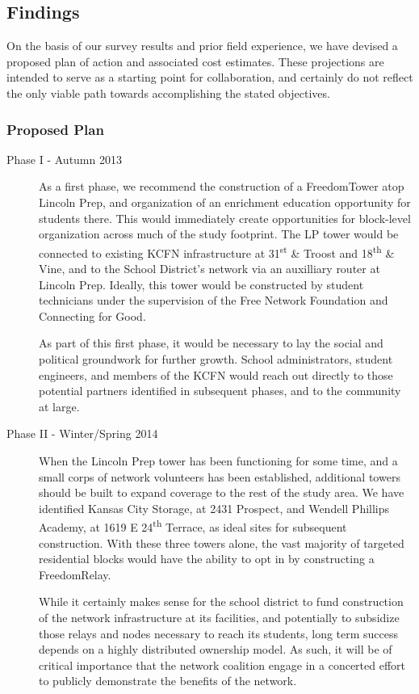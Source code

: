 \subsection{Findings}
On the basis of our survey results and prior field experience, we have devised
a proposed plan of action and associated cost estimates. These projections are intended
to serve as a starting point for collaboration, and certainly do not reflect the
only viable path towards accomplishing the stated objectives.\par

\subsubsection{Proposed Plan}
\begin{description}
\item[Phase I - Autumn 2013]
As a first phase, we recommend the construction of a FreedomTower atop Lincoln
Prep, and organization of an enrichment education opportunity for
students there. This would immediately create opportunities for block-level
organization across much of the study footprint. The LP tower would be
connected to existing KCFN infrastructure at 31\textsuperscript{st} \& Troost
and 18\textsuperscript{th}
\& Vine, and to the School District's network via an auxilliary router at
Lincoln Prep. Ideally, this tower would be constructed by student technicians
under the supervision of the Free Network Foundation and Connecting for Good. \par
As part of this first phase, it would be necessary to lay the social and
political groundwork for further growth. School administrators, student
engineers, and members of the KCFN would reach out directly to those potential
partners identified in subsequent phases, and to the community at large. \par

\item[Phase II - Winter/Spring 2014]
When the Lincoln Prep tower has been functioning for some time, and a small
corps of network volunteers has been established, additional towers should be
built to expand coverage to the rest of the study area. We have identified
Kansas City Storage, at 2431 Prospect, and Wendell Phillips Academy, at 1619 E
24\textsuperscript{th} Terrace, as ideal sites for subsequent construction. With these three
towers alone, the vast majority of targeted residential blocks would have the
ability to opt in by constructing a FreedomRelay. \par
While it certainly makes sense for the school district to fund  construction
of the network infrastructure at its facilities, and potentially to subsidize
those relays and nodes necessary to reach its students, long term success
depends on a highly distributed ownership model. As such, it will be of critical
importance that the network coalition engage in a concerted 
effort to publicly demonstrate the benefits of the network.\par


\end{description}
